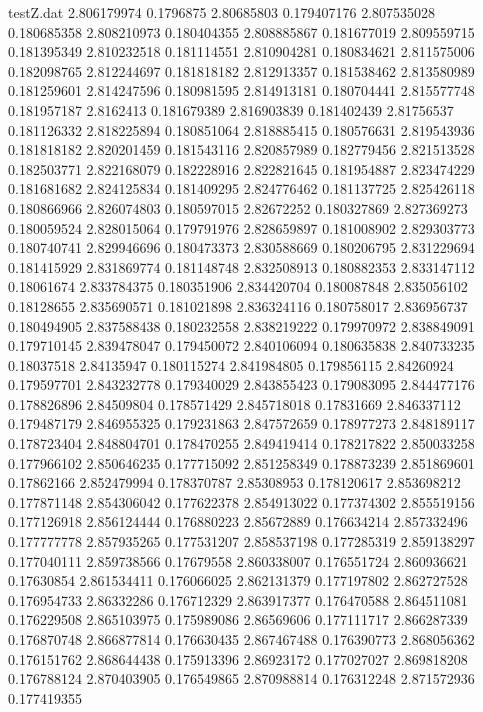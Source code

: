 \begin{filecontents*}{testZ.dat}
2.806179974  0.1796875
2.80685803  0.179407176
2.807535028  0.180685358
2.808210973  0.180404355
2.808885867  0.181677019
2.809559715  0.181395349
2.810232518  0.181114551
2.810904281  0.180834621
2.811575006  0.182098765
2.812244697  0.181818182
2.812913357  0.181538462
2.813580989  0.181259601
2.814247596  0.180981595
2.814913181  0.180704441
2.815577748  0.181957187
2.8162413  0.181679389
2.816903839  0.181402439
2.81756537  0.181126332
2.818225894  0.180851064
2.818885415  0.180576631
2.819543936  0.181818182
2.820201459  0.181543116
2.820857989  0.182779456
2.821513528  0.182503771
2.822168079  0.182228916
2.822821645  0.181954887
2.823474229  0.181681682
2.824125834  0.181409295
2.824776462  0.181137725
2.825426118  0.180866966
2.826074803  0.180597015
2.82672252  0.180327869
2.827369273  0.180059524
2.828015064  0.179791976
2.828659897  0.181008902
2.829303773  0.180740741
2.829946696  0.180473373
2.830588669  0.180206795
2.831229694  0.181415929
2.831869774  0.181148748
2.832508913  0.180882353
2.833147112  0.18061674
2.833784375  0.180351906
2.834420704  0.180087848
2.835056102  0.18128655
2.835690571  0.181021898
2.836324116  0.180758017
2.836956737  0.180494905
2.837588438  0.180232558
2.838219222  0.179970972
2.838849091  0.179710145
2.839478047  0.179450072
2.840106094  0.180635838
2.840733235  0.18037518
2.84135947  0.180115274
2.841984805  0.179856115
2.84260924  0.179597701
2.843232778  0.179340029
2.843855423  0.179083095
2.844477176  0.178826896
2.84509804  0.178571429
2.845718018  0.17831669
2.846337112  0.179487179
2.846955325  0.179231863
2.847572659  0.178977273
2.848189117  0.178723404
2.848804701  0.178470255
2.849419414  0.178217822
2.850033258  0.177966102
2.850646235  0.177715092
2.851258349  0.178873239
2.851869601  0.17862166
2.852479994  0.178370787
2.85308953  0.178120617
2.853698212  0.177871148
2.854306042  0.177622378
2.854913022  0.177374302
2.855519156  0.177126918
2.856124444  0.176880223
2.85672889  0.176634214
2.857332496  0.177777778
2.857935265  0.177531207
2.858537198  0.177285319
2.859138297  0.177040111
2.859738566  0.17679558
2.860338007  0.176551724
2.860936621  0.17630854
2.861534411  0.176066025
2.862131379  0.177197802
2.862727528  0.176954733
2.86332286  0.176712329
2.863917377  0.176470588
2.864511081  0.176229508
2.865103975  0.175989086
2.86569606  0.177111717
2.866287339  0.176870748
2.866877814  0.176630435
2.867467488  0.176390773
2.868056362  0.176151762
2.868644438  0.175913396
2.86923172  0.177027027
2.869818208  0.176788124
2.870403905  0.176549865
2.870988814  0.176312248
2.871572936  0.177419355

\end{filecontents*}
